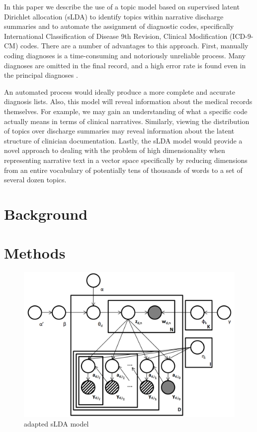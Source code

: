\documentclass{article}
\begin{document}
In this paper we describe the use of a topic model based on supervised
latent Dirichlet allocation (sLDA) to identify topics within narrative
discharge summaries and to automate the assignment of diagnostic codes,
specifically International Classification of Disease 9th Revision,
Clinical Modification (ICD-9-CM) codes. There are a number of advantages
to this approach. First, manually coding diagnoses is a time-consuming
and notoriously unreliable process. Many diagnoses are omitted in
the final record, and a high error rate is found even in the principal
diagnoses \citep{Surjan1999}.



An automated process would ideally produce a more complete and accurate
diagnosis lists. Also, this model will reveal information about the
medical records themselves. For example, we may gain an understanding
of what a specific code actually means in terms of clinical narratives.
Similarly, viewing the distribution of topics over discharge summaries
may reveal information about the latent structure of clinician documentation.
Lastly, the sLDA model would provide a novel approach to dealing with
the problem of high dimensionality when representing narrative text
in a vector space specifically by reducing dimensions from an entire
vocabulary of potentially tens of thousands of words to a set of several
dozen topics.


\section{Background}


\section{Methods}


%
\begin{figure}[h]
 \centering \includegraphics[scale=0.3]{Graphical_Model2} \caption{adapted sLDA model}


\label{fig:example} 
\end{figure}
\end{document}
